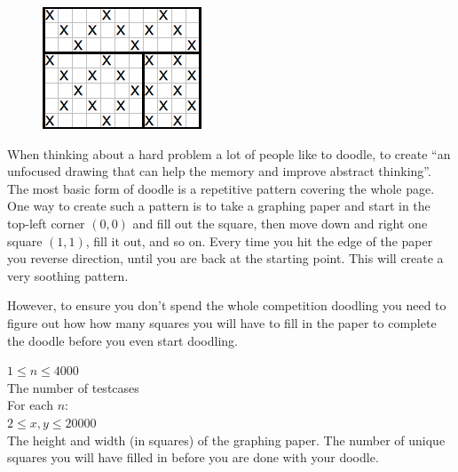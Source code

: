 
\begin{figure}
\vspace{-5mm}
\includegraphics[width=\linewidth,keepaspectratio=true]{doodle/doodle}
\vspace{-9mm}
\end{figure}

\noindent
When thinking about a hard problem a lot of people like to doodle, to create ``an unfocused drawing that can help the memory and improve abstract thinking''. The most basic form of doodle is a repetitive pattern covering the whole page. One way to create such a pattern is to take a graphing paper and start in the top-left corner $(0,0)$ and fill out the square, then move down and right one square $(1,1)$, fill it out, and so on. Every time you hit the edge of the paper you reverse direction, until you are back at the starting point. This will create a very soothing pattern.

However, to ensure you don't spend the whole competition doodling you need to figure out how how many squares you will have to fill in the paper to complete the doodle before you even start doodling.

\Input
$1 \leq n \leq 4000$\\
The number of testcases\\
For each $n$:\\
$2 \leq x, y \leq 20000$\\
The height and width (in squares) of the graphing paper.
\Output
The number of unique squares you will have filled in before you are done with your doodle.


